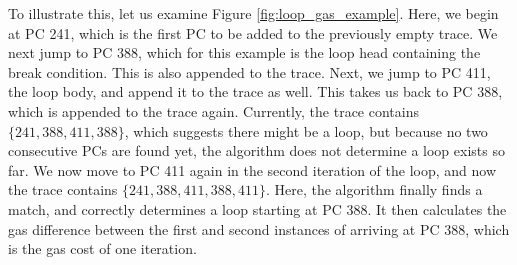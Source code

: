 To illustrate this, let us examine Figure \ref{fig:loop_gas_example}. Here, we begin at PC 241,
which is the first PC to be added to the previously empty trace. We next jump to PC 388, which
for this example is the loop head containing the break condition. This is also appended to the trace.
Next, we jump to PC 411, the loop body,  and append it to the trace as well. This takes us back to
PC 388, which is appended to the trace again. Currently, the trace contains $\{241, 388, 411, 388\}$,
which suggests there might be a loop, but because no two consecutive PCs are found yet, the algorithm
does not determine a loop exists so far. We now move to PC 411 again in the second iteration of the loop,
and now the trace contains $\{241, 388, 411, 388, 411\}$. Here, the algorithm finally finds a match, and 
correctly determines a loop starting at PC 388. It then calculates the gas difference between the first and 
second instances of arriving at PC 388, which is the gas cost of one iteration. 

